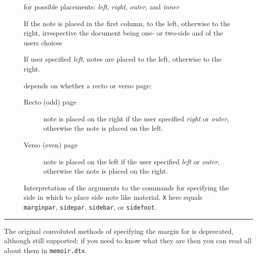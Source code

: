 \begin{figure}[htbp]
  \centering
  \begin{minipage}{0.9\linewidth}
     for possible placements: \emph{left},
    \emph{right}, \emph{outer}, and \emph{inner}\\
    \renewcommand\descriptionlabel[1]{\hspace\labelsep\normalfont\sffamily\bfseries #1}
    \begin{description}
     \small
    \item[Two column document] If the note is placed in the first
      column, to the left, otherwise  to the right, irrespective the
      document being one- or two-side and of the users choices
\item[One sided document] If user specified \emph{left}, notes are
  placed to the left, otherwise to the right. 
\item[Two sided document] depends on whether a recto or verso page:
   \begin{description}
   \item[Recto (odd) page] note is placed on the right if the user
     specified \emph{right} or \emph{outer}, otherwise the note is
     placed on the left.
   \item[Verso (even) page] note is placed on the left if the user
     specified \emph{left} or \emph{outer}, otherwise the note is
     placed on the right.
   \end{description}
\end{description}
  \end{minipage}
  \caption{Interpretation of the arguments to the 
    commands for specifying the side in which to place side note like
    material. \texttt{X} here equals \texttt{marginpar},
    \texttt{sidepar}, \texttt{sidebar}, or \texttt{sidefoot}.} 
  \label{fig:xmargin}
\end{figure}

\fancybreak{}

The original convoluted methods of specifying the margin for
\cmd{\marginpar} is deprecated, although still supported; if you need
to know what they are then you can read all about them in \texttt{memoir.dtx}.

